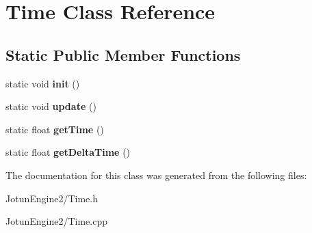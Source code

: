 \hypertarget{class_time}{\section{Time Class Reference}
\label{class_time}
}
\subsection*{Static Public Member Functions}
\begin{DoxyCompactItemize}
\item 
\hypertarget{class_time_ac626e60d7767728dca61c1095cb9678c}{static void {\bfseries init} ()}\label{class_time_ac626e60d7767728dca61c1095cb9678c}

\item 
\hypertarget{class_time_a1463d5551f982b457d88b6bd4e077903}{static void {\bfseries update} ()}\label{class_time_a1463d5551f982b457d88b6bd4e077903}

\item 
\hypertarget{class_time_ad6773c7a2339b463fc7ea14e31315c89}{static float {\bfseries get\-Time} ()}\label{class_time_ad6773c7a2339b463fc7ea14e31315c89}

\item 
\hypertarget{class_time_a405c7642c4ba0ee719a8d0491099102a}{static float {\bfseries get\-Delta\-Time} ()}\label{class_time_a405c7642c4ba0ee719a8d0491099102a}

\end{DoxyCompactItemize}


The documentation for this class was generated from the following files\-:\begin{DoxyCompactItemize}
\item 
Jotun\-Engine2/Time.\-h\item 
Jotun\-Engine2/Time.\-cpp\end{DoxyCompactItemize}

